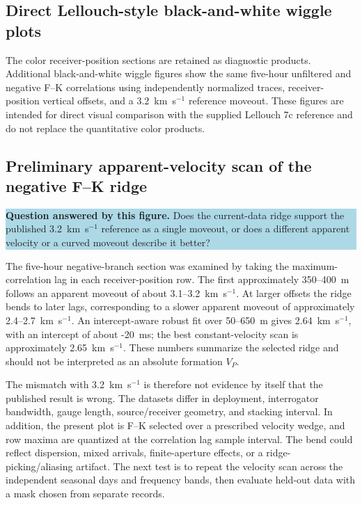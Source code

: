 \documentclass[11pt]{article}
\newcommand{\figquestion}[1]{\par\medskip\noindent\colorbox{lightblue}{\parbox{0.95\linewidth}{\textcolor{questionblue}{\textbf{Question answered by this figure.}} #1}}\par\medskip}
\begin{document}
\subsection{Direct Lellouch-style black-and-white wiggle plots}
The color receiver-position sections are retained as diagnostic products. Additional black-and-white wiggle figures show the same five-hour unfiltered and negative F--K correlations using independently normalized traces, receiver-position vertical offsets, and a 3.2~km~s$^{-1}$ reference moveout. These figures are intended for direct visual comparison with the supplied Lellouch 7c reference and do not replace the quantitative color products.


\subsection{Preliminary apparent-velocity scan of the negative F--K ridge}
\figquestion{Does the current-data ridge support the published 3.2~km~s$^{-1}$ reference as a single moveout, or does a different apparent velocity or a curved moveout describe it better?}

The five-hour negative-branch section was examined by taking the maximum-correlation lag in each receiver-position row. The first approximately 350--400~m follows an apparent moveout of about 3.1--3.2~km~s$^{-1}$. At larger offsets the ridge bends to later lags, corresponding to a slower apparent moveout of approximately 2.4--2.7~km~s$^{-1}$. An intercept-aware robust fit over 50--650~m gives 2.64~km~s$^{-1}$, with an intercept of about -20~ms; the best constant-velocity scan is approximately 2.65~km~s$^{-1}$. These numbers summarize the selected ridge and should not be interpreted as an absolute formation $V_P$.

The mismatch with 3.2~km~s$^{-1}$ is therefore not evidence by itself that the published result is wrong. The datasets differ in deployment, interrogator bandwidth, gauge length, source/receiver geometry, and stacking interval. In addition, the present plot is F--K selected over a prescribed velocity wedge, and row maxima are quantized at the correlation lag sample interval. The bend could reflect dispersion, mixed arrivals, finite-aperture effects, or a ridge-picking/aliasing artifact. The next test is to repeat the velocity scan across the independent seasonal days and frequency bands, then evaluate held-out data with a mask chosen from separate records.
\end{document}
